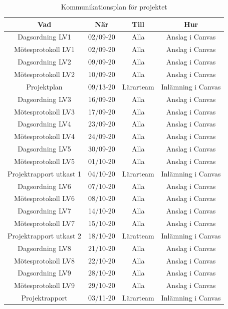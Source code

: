 \documentclass[a4paper]{article}
\begin{document}
\begin{table}[H]
    \centering
    \begin{tabular}{ |c|c|c|c| }\hline
     Vad & När & Till & Hur \\\hline
     Dagsordning LV1 & 02/09-20 & Alla & Anslag i Canvas \\\hline
     Mötesprotokoll LV1 & 02/09-20 & Alla & Anslag i Canvas \\\hline
     Dagsordning LV2 & 09/09-20 & Alla & Anslag i Canvas \\\hline
     Mötesprotokoll LV2 & 10/09-20 & Alla & Anslag i Canvas \\\hline
     Projektplan & 09/13-20 & Lärarteam & Inlämning i Canvas\\\hline 
     Dagsordning LV3 & 16/09-20 & Alla & Anslag i Canvas \\\hline
     Mötesprotokoll LV3 & 17/09-20 & Alla & Anslag i Canvas \\\hline
     Dagsordning LV4 & 23/09-20 & Alla & Anslag i Canvas \\\hline
     Mötesprotokoll LV4 & 24/09-20 & Alla & Anslag i Canvas \\\hline
     Dagsordning LV5 & 30/09-20 & Alla & Anslag i Canvas \\\hline
     Mötesprotokoll LV5 & 01/10-20 & Alla & Anslag i Canvas \\\hline
     Projektrapport utkast 1 & 04/10-20 & Lärarteam & Inlämning i Canvas \\\hline
     Dagsordning LV6 & 07/10-20 & Alla & Anslag i Canvas \\\hline
     Mötesprotokoll LV6 & 08/10-20 & Alla & Anslag i Canvas \\\hline
     Dagsordning LV7 & 14/10-20 & Alla & Anslag i Canvas \\\hline
     Mötesprotokoll LV7 & 15/10-20 & Alla & Anslag i Canvas \\\hline
     Projektrapport utkast 2 & 18/10-20 & Läratteam & Inlämning i Canvas \\\hline
     Dagsordning LV8 & 21/10-20 & Alla & Anslag i Canvas \\\hline
     Mötesprotokoll LV8 & 22/10-20 & Alla & Anslag i Canvas \\\hline
     Dagsordning LV9 & 28/10-20 & Alla & Anslag i Canvas \\\hline
     Mötesprotokoll LV9 & 29/10-20 & Alla & Anslag i Canvas \\\hline
     Projektrapport & 03/11-20 & Lärarteam & Inlämning i Canvas \\\hline
    \end{tabular}
    \caption{Kommunikationsplan för projektet}
    \label{table:kommunikationsplan}
\end{table}
\end{document}

